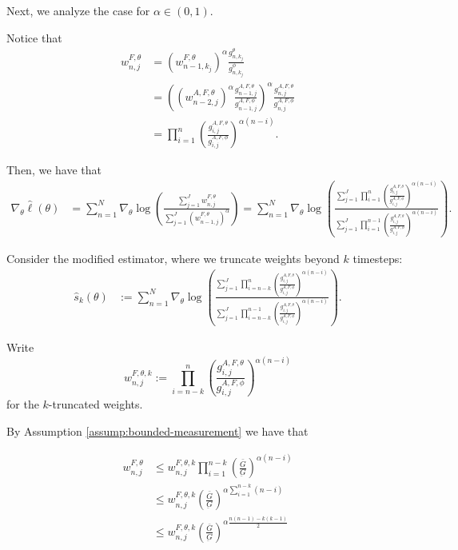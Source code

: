 \documentclass{article}
\begin{document}
Next, we analyze the case for $\alpha \in (0,1)$. 

Notice that
\begin{align*}
    w_{n,j}^{F,\theta}
    &= \left(w_{n-1,k_j}^{F, \theta}\right)^\alpha\frac{g_{n,k_j}^\theta}{g_{n,k_j}^\phi} \\
    &= \left(\left(w_{n-2,j}^{A,F, \theta}\right)^\alpha\frac{g_{n-1,j}^{A,F,\theta}}{g_{n-1,j}^{A,F,\phi}}\right)^\alpha\frac{g_{n,j}^{A,F,\theta}}{g_{n,j}^{A,F,\phi}} \\
    &= \prod_{i=1}^n \left(\frac{g_{i,j}^{A,F,\theta}}{g_{i,j}^{A,F,\phi}} \right)^{\alpha(n-i)}.
\end{align*}

Then, we have that
\begin{align*}
    \nabla_\theta\hat\ell(\theta) 
    &= \sum_{n=1}^N \nabla_\theta \log\left(\frac{\sum_{j=1}^Jw_{n,j}^{F,\theta}}{\sum_{j=1}^J\left(w_{n-1,j}^{F, \theta}\right)^\alpha}\right)= \sum_{n=1}^N \nabla_\theta \log\left(\frac{\sum_{j=1}^J\prod_{i=1}^n\left(\frac{g_{i,j}^{A,F,\theta}}{g_{i,j}^{A,F,\phi}} \right)^{\alpha(n-i)}}{\sum_{j=1}^J\prod_{i=1}^{n-1}\left(\frac{g_{i,j}^{A,F,\theta}}{g_{i,j}^{A,F,\phi}} \right)^{\alpha(n-i)}}\right).
\end{align*}

Consider the modified estimator, where we truncate weights beyond $k$ timesteps:
\begin{align*}
    \hat{s}_k(\theta) 
    &:= \sum_{n=1}^N \nabla_\theta\log\left(\frac{\sum_{j=1}^J\prod_{i=n-k}^n\left(\frac{g_{i,j}^{A,F,\theta}}{g_{i,j}^{A,F,\phi}} \right)^{\alpha(n-i)}}{\sum_{j=1}^J\prod_{i=n-k}^{n-1}\left(\frac{g_{i,j}^{A,F,\theta}}{g_{i,j}^{A,F,\phi}} \right)^{\alpha(n-i)}}\right).
\end{align*}

Write $$w_{n,j}^{F,\theta,k} := \prod_{i=n-k}^n\left(\frac{g_{i,j}^{A,F,\theta}}{g_{i,j}^{A,F,\phi}} \right)^{\alpha(n-i)}$$ for the $k$-truncated weights.

By Assumption \ref{assump:bounded-measurement} we have that 

\begin{align*}
   w_{n,j}^{F,\theta} 
    &\leq w_{n,j}^{F,\theta,k} \prod_{i=1}^{n-k}\left(\frac{\bar{G}}{\underbar{G}}\right)^{\alpha(n-i)}\\
    &\leq w_{n,j}^{F,\theta,k} \left(\frac{\bar{G}}{\underbar{G}}\right)^{\alpha \sum_{i=1}^{n-k}(n-i)} \\
    &\leq w_{n,j}^{F,\theta,k} \left(\frac{\bar{G}}{\underbar{G}}\right)^{\alpha\frac{n(n-1)-k(k-1)}{2}}
\end{align*}
\end{document}
